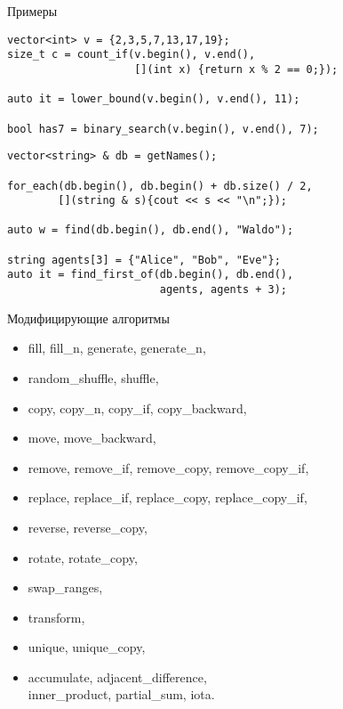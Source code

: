 \documentclass{beamer}
\begin{document}
\begin{frame}[fragile]{Примеры}
\begin{lstlisting}
vector<int> v = {2,3,5,7,13,17,19};
size_t c = count_if(v.begin(), v.end(),
                    [](int x) {return x % 2 == 0;});
                    
auto it = lower_bound(v.begin(), v.end(), 11);

bool has7 = binary_search(v.begin(), v.end(), 7);
\end{lstlisting}
\begin{lstlisting}
vector<string> & db = getNames();

for_each(db.begin(), db.begin() + db.size() / 2, 
        [](string & s){cout << s << "\n";});

auto w = find(db.begin(), db.end(), "Waldo");

string agents[3] = {"Alice", "Bob", "Eve"};
auto it = find_first_of(db.begin(), db.end(),
                        agents, agents + 3);
\end{lstlisting}
\end{frame}


\begin{frame}[fragile]{Модифицирующие алгоритмы}
\begin{itemize}
    \tt
    \item fill, fill\_n, generate, generate\_n,
    \item random\_shuffle, shuffle,
    \item copy, copy\_n, copy\_if, copy\_backward,
    \item move, move\_backward,
    \item remove, remove\_if, remove\_copy, remove\_copy\_if,
    \item replace, replace\_if, replace\_copy, replace\_copy\_if,
    \item reverse, reverse\_copy,
    \item rotate, rotate\_copy,
    \item swap\_ranges,  
    \item transform,
    \item unique, unique\_copy,
    \item[\textbf{\textasteriskcentered}] accumulate, adjacent\_difference,\\ inner\_product, partial\_sum, iota.
\end{itemize}
\end{frame}
\end{document}
